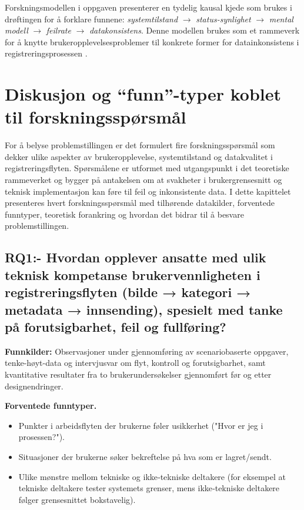 Forskningsmodellen i oppgaven presenterer en tydelig kausal kjede som brukes i drøftingen for å forklare funnene: \emph{systemtilstand} $\rightarrow$ \emph{status-synlighet} $\rightarrow$ \emph{mental modell} $\rightarrow$ \emph{feilrate} $\rightarrow$ \emph{datakonsistens}. Denne modellen brukes som et rammeverk for å knytte brukeropplevelsesproblemer til konkrete former for datainkonsistens i registreringsprosessen \cite{nielsen1994,norman2013,wang1996}.

\section{Diskusjon og ``funn''-typer koblet til forskningsspørsmål}

For å belyse problemstillingen er det formulert fire forskningsspørsmål som dekker ulike aspekter av brukeropplevelse, systemtilstand og datakvalitet i registreringsflyten. Spørsmålene er utformet med utgangspunkt i det teoretiske rammeverket og bygger på antakelsen om at svakheter i brukergrensesnitt og teknisk implementasjon kan føre til feil og inkonsistente data. I dette kapittelet presenteres hvert forskningsspørsmål med tilhørende datakilder, forventede funntyper, teoretisk forankring og hvordan det bidrar til å besvare problemstillingen.


\subsection{RQ1:- Hvordan opplever ansatte med ulik teknisk kompetanse brukervennligheten i registreringsflyten (bilde → kategori → metadata → innsending), spesielt med tanke på forutsigbarhet, feil og fullføring?
}

\textbf{Funnkilder:} Observasjoner under gjennomføring av scenariobaserte oppgaver, tenke-høyt-data og intervjusvar om flyt, kontroll og forutsigbarhet, samt kvantitative resultater fra to brukerundersøkelser gjennomført før og etter designendringer.

\textbf{Forventede funntyper.}
\begin{itemize}
  \item  Punkter i arbeidsflyten der brukerne føler usikkerhet ("Hvor er jeg i prosessen?").
  \item Situasjoner der brukerne søker bekreftelse på hva som er lagret/sendt.
  \item Ulike mønstre mellom tekniske og ikke‑tekniske deltakere (for eksempel at tekniske deltakere tester systemets grenser, mens ikke‑tekniske deltakere følger grensesnittet bokstavelig).
\end{itemize}

